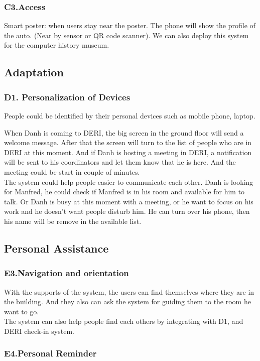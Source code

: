 \documentclass[a4paper]{llncs}
\begin{document}
\subsubsection{C3.Access}
Smart poster: when users stay near the poster. The phone will show the profile of the auto. (Near by sensor or QR code scanner). We can also deploy this system for the computer history museum.
\subsection{Adaptation}
\subsubsection{D1. Personalization of Devices}
People could be identified by their personal devices such as mobile phone, laptop. 



When Danh is coming to DERI, the big screen in the ground floor will send a welcome message. After that the screen will turn to the list of people who are in DERI at this moment. And if Danh is hosting a meeting in DERI, a notification will be sent to his coordinators and let them know that he is here. And the meeting could be start in couple of minutes.\\
The system could help people easier to communicate each other. Danh is looking for Manfred, he could check if Manfred is in his room and available for him to talk. Or Danh is busy at this moment with a  meeting, or he want to focus on his work and he doesn't want people disturb him. He can turn over his phone, then his name will be remove in the available list.\\
\subsection{Personal Assistance}
\subsubsection{E3.Navigation and orientation}
With the supports of the system, the users can find themselves where they are in the building. And they also can ask the system for guiding them to the room he want to go.\\
The system can also help people find each others by integrating with D1, and DERI check-in system.
\subsubsection{E4.Personal Reminder}
\end{document}
